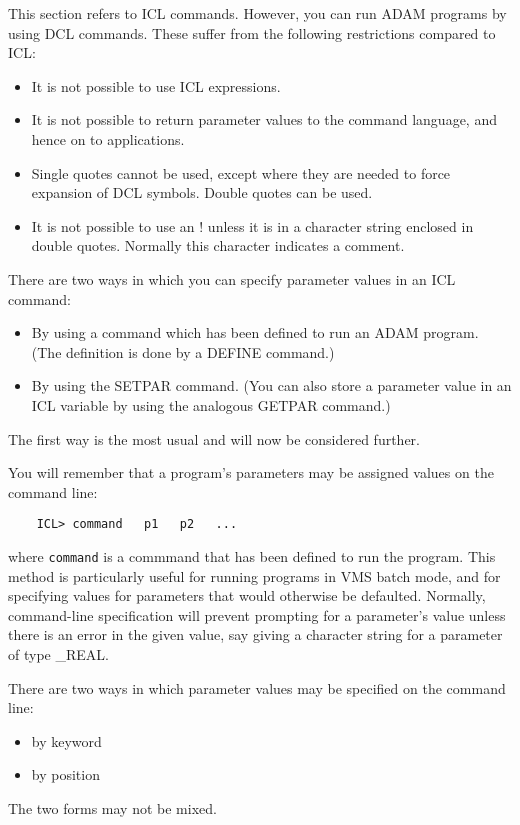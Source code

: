 This section refers to ICL commands.
However, you can run ADAM programs by using DCL commands.
These suffer from the following restrictions compared to ICL:
\begin{itemize}
\item It is not possible to use ICL expressions.
\item It is not possible to return parameter values to the command language, and
hence on to applications.
\item Single quotes cannot be used, except where they are needed to force
expansion of DCL symbols.
Double quotes can be used.
\item It is not possible to use an ! unless it is in a character string
enclosed in double quotes.
Normally this character indicates a comment.
\end{itemize}
There are two ways in which you can specify parameter values in an ICL command:
\begin{itemize}
\item By using a command which has been defined to run an ADAM program.
 (The definition is done by a DEFINE command.)
\item By using the SETPAR command.
(You can also store a parameter value in an ICL variable by using the
analogous GETPAR command.)
\end{itemize}
The first way is the most usual and will now be considered further.

You will remember that a program's parameters may be assigned values on the
command line:

\begin{small}
\begin{verbatim}
    ICL> command   p1   p2   ...
\end{verbatim}
\end{small}

where {\tt command} is a commmand that has been defined to run the program.
This method is particularly useful for running programs in VMS batch mode,
and for specifying values for parameters that would otherwise be defaulted.
Normally, command-line specification will prevent prompting for a parameter's
value unless there is an error in the given value, say giving a character
string for a parameter of type \_REAL.
 
There are two ways in which parameter values may be specified on the command
line:
\begin{itemize}
\item by keyword
\item by position
\end{itemize}
The two forms may not be mixed.

